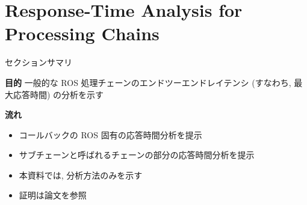 
\section{Response-Time Analysis for Processing Chains}
\label{sec: response-time analysis for processing chains}

\begin{frame}{セクションサマリ}
    \begin{itembox}[l]{\textbf{目的}}
        一般的な ROS 処理チェーンのエンドツーエンドレイテンシ (すなわち, 最大応答時間) の分析を示す
    \end{itembox}
    \begin{itembox}[l]{\textbf{流れ}}
        \begin{itemize}
            \item コールバックの ROS 固有の応答時間分析を提示
            \item サブチェーンと呼ばれるチェーンの部分の応答時間分析を提示
        \end{itemize}
    \end{itembox}
\end{frame}

\begin{frame}{}
    \begin{itemize}
        \item 本資料では, 分析方法のみを示す
        \item 証明は論文を参照
    \end{itemize}
\end{frame}

